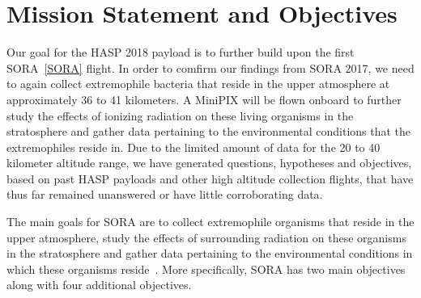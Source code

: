 \section{Mission Statement and Objectives}
\label{sec:Introduction}

Our goal for the HASP 2018 payload is to further build upon the first SORA~\ref{SORA} flight.  In order to comfirm our findings from SORA 2017, we need to again collect extremophile bacteria that reside in the upper atmosphere at approximately 36 to 41 kilometers.  A MiniPIX will be flown onboard to further study the effects of ionizing radiation on these living organisms in the stratosphere and gather data pertaining to the environmental conditions that the extremophiles reside in. Due to the limited amount of data for the 20 to 40 kilometer altitude range, we have generated questions, hypotheses and objectives, based on past HASP payloads and other high altitude collection flights, that have thus far remained unanswered or have little corroborating data.


The main goals for SORA are to collect extremophile organisms that reside in the upper atmosphere, study the effects of surrounding radiation on these organisms in the stratosphere and gather data pertaining to the environmental conditions in which these organisms reside~\cite{SORA}.  More specifically, SORA has two main objectives along with four additional objectives.\\

